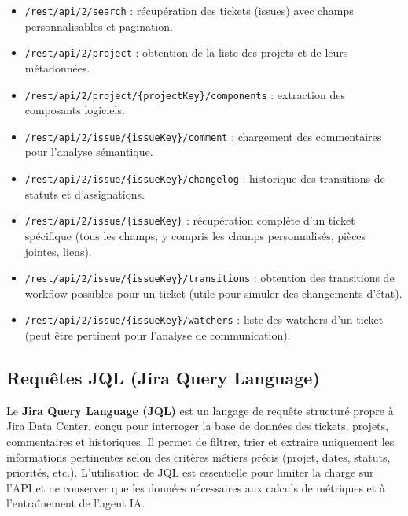 \begin{itemize}
    \renewcommand{\labelitemi}{—}
    \item \texttt{/rest/api/2/search} : récupération des tickets (issues) avec champs personnalisables et pagination.
    \item \texttt{/rest/api/2/project} : obtention de la liste des projets et de leurs métadonnées.
    \item \texttt{/rest/api/2/project/\{projectKey\}/components} : extraction des composants logiciels.
    \item \texttt{/rest/api/2/issue/\{issueKey\}/comment} : chargement des commentaires pour l’analyse sémantique.
    \item \texttt{/rest/api/2/issue/\{issueKey\}/changelog} : historique des transitions de statuts et d’assignations.
    \item \texttt{/rest/api/2/issue/\{issueKey\}} : récupération complète d’un ticket spécifique (tous les champs, y compris les champs personnalisés, pièces jointes, liens).
    \item \texttt{/rest/api/2/issue/\{issueKey\}/transitions} : obtention des transitions de workflow possibles pour un ticket (utile pour simuler des changements d’état).
    \item \texttt{/rest/api/2/issue/\{issueKey\}/watchers} : liste des watchers d’un ticket (peut être pertinent pour l’analyse de communication).
\end{itemize}

\subsection{Requêtes JQL (Jira Query Language)}

Le \textbf{Jira Query Language (JQL)} est un langage de requête structuré propre à Jira Data Center, conçu pour interroger la base de données des tickets, projets, commentaires et historiques. Il permet de filtrer, trier et extraire uniquement les informations pertinentes selon des critères métiers précis (projet, dates, statuts, priorités, etc.). L’utilisation de JQL est essentielle pour limiter la charge sur l’API et ne conserver que les données nécessaires aux calculs de métriques et à l’entraînement de l’agent IA.

